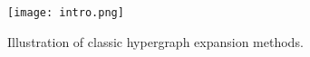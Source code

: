 \begin{figure}
\vspace{-1mm}
\begin{center}
    \texttt{[image: intro.png]}
\end{center}
\vspace{-3mm}
\caption{Illustration of classic hypergraph expansion methods.}
\label{fig: intro}
\vspace{-5mm}
\end{figure}
